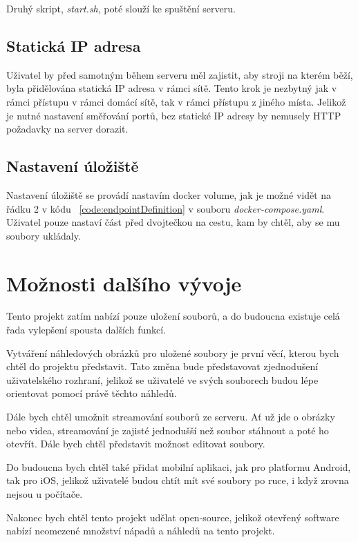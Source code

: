 \documentclass[
  glossaries,
]{kidiplom}
\begin{document}
Druhý skript, \textit{start.sh}, poté slouží ke spuštění serveru.

\subsection{Statická IP adresa}
Uživatel by před samotným během serveru měl zajistit, aby stroji na kterém běží, byla přidělována statická IP adresa v rámci sítě. Tento krok je nezbytný jak v rámci přístupu v rámci domácí sítě, tak v rámci přístupu z jiného místa. Jelikož je nutné nastavení směřování portů, bez statické IP adresy by nemusely HTTP požadavky na server dorazit.

\subsection{Nastavení úložiště}
Nastavení úložiště se provádí nastavím docker volume, jak je možné vidět na řádku 2 v kódu ~\ref{code:endpointDefinition} v souboru \textit{docker-compose.yaml}. Uživatel pouze nastaví část před dvojtečkou na cestu, kam by chtěl, aby se mu soubory ukládaly.
\clearpage
\section{Možnosti dalšího vývoje}
Tento projekt zatím nabízí pouze uložení souborů, a do budoucna existuje celá řada vylepšení spousta dalších funkcí. 

Vytváření náhledových obrázků pro uložené soubory je první věcí, kterou bych chtěl do projektu představit. Tato změna bude představovat zjednodušení uživatelského rozhraní, jelikož se uživatelé ve svých souborech budou lépe orientovat pomocí právě těchto náhledů.

Dále bych chtěl umožnit streamování souborů ze serveru. Ať už jde o obrázky nebo videa, streamování je zajisté jednodušší než soubor stáhnout a poté ho otevřít. Dále bych chtěl představit možnost editovat soubory.

Do budoucna bych chtěl také přidat mobilní aplikaci, jak pro platformu Android, tak pro iOS, jelikož uživatelé budou chtít mít své soubory po ruce, i když zrovna nejsou u počítače.

Nakonec bych chtěl tento projekt udělat open-source, jelikož otevřený software nabízí neomezené množství nápadů a náhledů na tento projekt.
\end{document}

